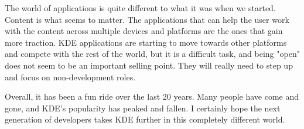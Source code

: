 The world of applications is quite different to what it was when we started. Content is what seems to matter. The applications that can help the user work with the content across multiple devices and platforms are the ones that gain more traction. KDE applications are starting to move towards other platforms and compete with the rest of the world, but it is a difficult task, and being "open" does not seem to be an important selling point. They will really need to step up and focus on non-development roles.

Overall, it has been a fun ride over the last 20 years. Many people have come and gone, and KDE’s popularity has peaked and fallen. I certainly hope the next generation of developers takes KDE further in this completely different world.
